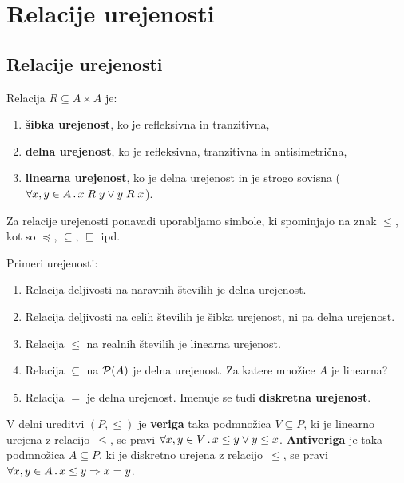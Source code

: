\chapter{Relacije urejenosti}

\section{Relacije urejenosti}
\begin{definicija}
  Relacija $R \subseteq A \times A$ je:
  \begin{enumerate}
  \item \textbf{šibka urejenost}, ko je refleksivna in tranzitivna,
  \item \textbf{delna urejenost}, ko je refleksivna, tranzitivna in antisimetrična,
  \item \textbf{linearna urejenost}, ko je delna urejenost in je strogo sovisna ($\forall x, y \in A \,.\, x \mathrel{R} y \lor y \mathrel{R} x$).
  \end{enumerate}
\end{definicija}

Za relacije urejenosti ponavadi uporabljamo simbole, ki spominjajo na znak $\leq$, kot so $\preceq$, $\subseteq$, $\sqsubseteq$ ipd.

\begin{zgled}
  Primeri urejenosti:
  \begin{enumerate}
    \item Relacija deljivosti na naravnih številih je delna urejenost.
    \item Relacija deljivosti na celih številih je šibka urejenost, ni pa delna urejenost.
    \item Relacija $\leq$ na realnih številih je linearna urejenost.
    \item Relacija $\subseteq$ na $\mathcal{P}(A)$ je delna urejenost. Za katere množice $A$ je linearna?
    \item Relacija $=$ je delna urejenost. Imenuje se tudi \textbf{diskretna urejenost}.
  \end{enumerate}
\end{zgled}


\begin{definicija}
  V delni ureditvi $(P, {\leq})$ je \textbf{veriga} taka podmnožica $V \subseteq P$, ki je linearno urejena z relacijo~$\leq$, se pravi $\forall x, y \in V \,.\, x \leq y \lor y \leq x$. \textbf{Antiveriga} je taka podmnožica $A \subseteq P$, ki je diskretno urejena z relacijo~$\leq$, se pravi $\forall x, y \in A \,.\, x \leq y \Rightarrow x = y$.
\end{definicija}

